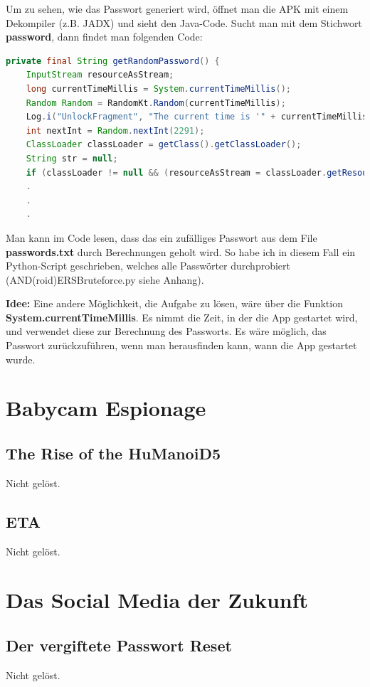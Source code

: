 \documentclass[12pt, a4paper, titlepage, oneside]{scrartcl}
\begin{document}
    \noindent Um zu sehen, wie das Passwort generiert wird, öffnet man die APK mit einem Dekompiler (z.B. JADX) und sieht den Java-Code. Sucht man mit dem Stichwort \textbf{password}, dann findet man folgenden Code:
    \begin{lstlisting}[language=java]
    private final String getRandomPassword() {
    InputStream resourceAsStream;
    long currentTimeMillis = System.currentTimeMillis();
    Random Random = RandomKt.Random(currentTimeMillis);
    Log.i("UnlockFragment", "The current time is '" + currentTimeMillis + "'");
    int nextInt = Random.nextInt(2291);
    ClassLoader classLoader = getClass().getClassLoader();
    String str = null;
    if (classLoader != null && (resourceAsStream = classLoader.getResourceAsStream("passwords.txt")) != null)
    .
    .
    .
    \end{lstlisting}
    Man kann im Code lesen, dass das ein zufälliges Passwort aus dem File \textbf{passwords.txt} durch Berechnungen geholt wird. So habe ich in diesem Fall ein Python-Script geschrieben, welches alle Passwörter durchprobiert (AND(roid)ERSBruteforce.py siehe Anhang). \newline
    
    \noindent\textbf{Idee:}
    Eine andere Möglichkeit, die Aufgabe zu lösen, wäre über die Funktion \textbf{System.currentTimeMillis}. Es nimmt die Zeit, in der die App gestartet wird, und verwendet diese zur Berechnung des Passworts. Es wäre möglich, das Passwort zurückzuführen, wenn man herausfinden kann, wann die App gestartet wurde.

	\section{Babycam Espionage}

	\subsection{The Rise of the HuManoiD5}
	Nicht gelöst.

	\subsection{ETA}
	Nicht gelöst.

	\section{Das Social Media der Zukunft}

	\subsection{Der vergiftete Passwort Reset}
	Nicht gelöst.
\end{document}
